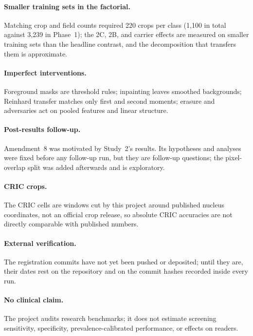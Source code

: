 \paragraph{Smaller training sets in the factorial.} Matching crop and field counts required 220 crops per class (1,100 in
total against 3,239 in Phase~1); the 2C, 2B, and carrier effects are measured on smaller training sets than the headline
contrast, and the decomposition that transfers them is approximate.

\paragraph{Imperfect interventions.} Foreground masks are threshold rules; inpainting leaves smoothed backgrounds; Reinhard
transfer matches only first and second moments; erasure and adversaries act on pooled features and linear structure.

\paragraph{Post-results follow-up.} Amendment~8 was motivated by Study~2's results. Its hypotheses and analyses were fixed
before any follow-up run, but they are follow-up questions; the pixel-overlap split was added afterwards and is
exploratory.

\paragraph{CRIC crops.} The CRIC cells are windows cut by this project around published nucleus coordinates, not an
official crop release, so absolute CRIC accuracies are not directly comparable with published numbers.

\paragraph{External verification.} The registration commits have not yet been pushed or deposited; until they are, their
dates rest on the repository and on the commit hashes recorded inside every run.

\paragraph{No clinical claim.} The project audits research benchmarks; it does not estimate screening sensitivity,
specificity, prevalence-calibrated performance, or effects on readers.

